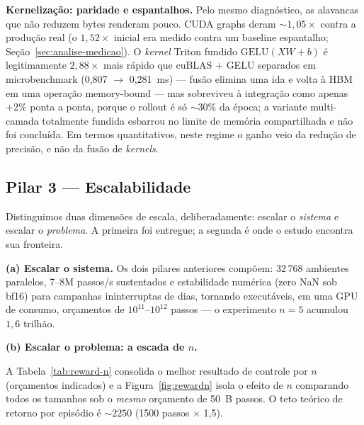 \documentclass[12pt]{article}
\begin{document}
\textbf{Kernelização: paridade e espantalhos.} Pelo mesmo diagnóstico, as
alavancas que não reduzem bytes renderam pouco. CUDA graphs deram
${\sim}1{,}05\times$ contra a produção real (o $1{,}52\times$ inicial era
medido contra um baseline espantalho; Seção~\ref{sec:analise-medicao}). O
\emph{kernel} Triton fundido $\mathrm{GELU}(XW{+}b)$ é legitimamente
$2{,}88\times$ mais rápido que cuBLAS $+$ GELU separados em microbenchmark
(0,807 $\to$ 0,281~ms) --- fusão elimina uma ida e volta à HBM em uma operação
memory-bound --- mas sobreviveu à integração como apenas $+2\%$ ponta a ponta,
porque o rollout é só ${\sim}30\%$ da época; a variante multi-camada
totalmente fundida esbarrou no limite de memória compartilhada e não foi
concluída. Em termos quantitativos, neste regime o ganho veio da redução de
precisão, e não da fusão de \emph{kernels}.

\subsection{Pilar 3 --- Escalabilidade}\label{sec:escalabilidade}

Distinguimos duas dimensões de escala, deliberadamente: escalar o
\emph{sistema} e escalar o \emph{problema}. A primeira foi entregue; a
segunda é onde o estudo encontra sua fronteira.

\textbf{(a) Escalar o sistema.} Os dois pilares anteriores compõem: 32\,768
ambientes paralelos, 7--8M passos/s sustentados e estabilidade numérica (zero
NaN sob bf16) para campanhas ininterruptas de dias, tornando executáveis, em
uma GPU de consumo, orçamentos de $10^{11}$--$10^{12}$ passos --- o
experimento $n{=}5$ acumulou $1{,}6$ trilhão.

\textbf{(b) Escalar o problema: a escada de $n$.}\label{sec:reward-n}

A Tabela~\ref{tab:reward-n} consolida o melhor resultado de controle por $n$
(orçamentos indicados) e a Figura~\ref{fig:rewardn} isola o efeito de $n$
comparando todos os tamanhos sob o \emph{mesmo} orçamento de 50~B passos. O
teto teórico de retorno por episódio é ${\sim}2250$ (1500 passos $\times$
1,5).
\end{document}
